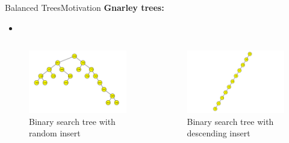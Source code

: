 \begin{frame}{Balanced Trees}{Motivation}
  \textbf{Gnarley trees:}\hfill
  \qrcode[height=5em]{\GnarleyTreesLink}\\
    \begin{itemize}
    \item \href{http://people.ksp.sk/~kuko/bak}{}
    \end{itemize}  
  \vspace{-2em}
  \begin{columns}
    \begin{column}[t]{0.5\linewidth}
      \begin{figure}
        \includegraphics[width=\linewidth]{Images/Motivation/BinarySearchTree_Random.png}
        \caption{Binary search tree with random insert~\cite{gnarley_trees}}
        \label{fig:motivation:binary_search_tree_random}
      \end{figure}
    \end{column}
    \begin{column}[t]{0.5\linewidth}
      \begin{figure}
        \includegraphics[width=\linewidth]{Images/Motivation/BinarySearchTree_Ordered.png}
        \caption{Binary search tree with descending insert~\cite{gnarley_trees}}
        \label{fig:motivation:binary_search_tree_ordered}
      \end{figure}
    \end{column}
  \end{columns}
 
\end{frame}

